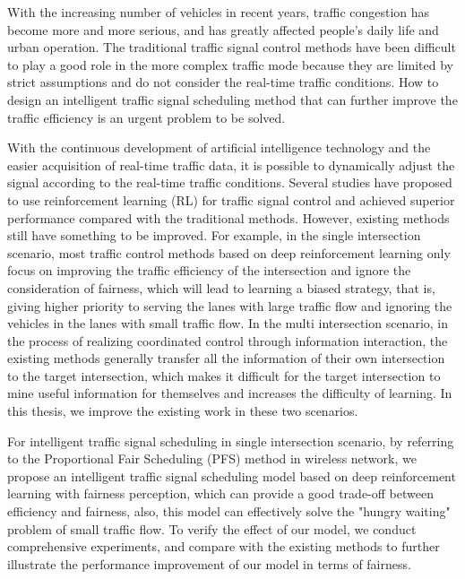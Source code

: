 \begin{abstractEn}
With the increasing number of vehicles in recent years, traffic congestion has become more and more serious, and has greatly affected people's daily life and urban operation. The traditional traffic signal control methods have been difficult to play a good role in the more complex traffic mode because they are limited by strict assumptions and do not consider the real-time traffic conditions. How to design an intelligent traffic signal scheduling method that can further improve the traffic efficiency is an urgent problem to be solved.

With the continuous development of artificial intelligence technology and the easier acquisition of real-time traffic data, it is possible to dynamically adjust the signal according to the real-time traffic conditions. Several studies have proposed to use reinforcement learning (RL) for traffic signal
control and achieved superior performance compared with the traditional methods. However, existing methods still have something to be improved. For example, in the single intersection scenario, most traffic control methods based on deep reinforcement learning only focus on improving the traffic efficiency of the intersection and ignore the consideration of fairness, which will lead to learning a biased strategy, that is, giving higher priority to serving the lanes with large traffic flow and ignoring the vehicles in the lanes with small traffic flow. 
In the multi intersection scenario, in the process of realizing coordinated control through information interaction, the existing methods generally transfer all the information of their own intersection to the target intersection, which makes it difficult for the target intersection to mine useful information for themselves and increases the difficulty of learning. In this thesis, we improve the existing work in these two scenarios.

For intelligent traffic signal scheduling in single intersection scenario, by referring to the Proportional Fair Scheduling (PFS) method in wireless network, we propose an intelligent traffic signal scheduling model based on deep reinforcement learning with fairness perception, which can provide a good trade-off between efficiency and fairness, also, this model can effectively solve the "hungry waiting" problem of small traffic flow. To verify the effect of our model, we conduct comprehensive experiments, and compare with the existing methods to further illustrate the performance improvement of our model in terms of fairness.


\end{abstractEn}
